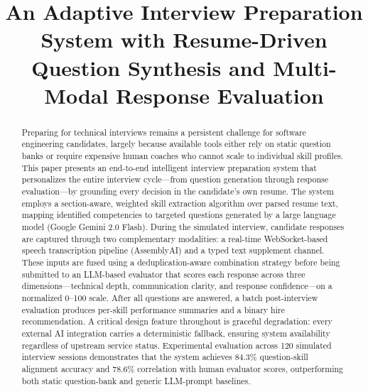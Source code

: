 \documentclass[conference]{IEEEtran}
\begin{document}
\title{An Adaptive Interview Preparation System with Resume-Driven Question Synthesis and Multi-Modal Response Evaluation}

\author{
}

\maketitle

\begin{abstract}
Preparing for technical interviews remains a persistent challenge for software engineering candidates, largely because available tools either rely on static question banks or require expensive human coaches who cannot scale to individual skill profiles. This paper presents an end-to-end intelligent interview preparation system that personalizes the entire interview cycle—from question generation through response evaluation—by grounding every decision in the candidate's own resume. The system employs a section-aware, weighted skill extraction algorithm over parsed resume text, mapping identified competencies to targeted questions generated by a large language model (Google Gemini 2.0 Flash). During the simulated interview, candidate responses are captured through two complementary modalities: a real-time WebSocket-based speech transcription pipeline (AssemblyAI) and a typed text supplement channel. These inputs are fused using a deduplication-aware combination strategy before being submitted to an LLM-based evaluator that scores each response across three dimensions—technical depth, communication clarity, and response confidence—on a normalized 0--100 scale. After all questions are answered, a batch post-interview evaluation produces per-skill performance summaries and a binary hire recommendation. A critical design feature throughout is graceful degradation: every external AI integration carries a deterministic fallback, ensuring system availability regardless of upstream service status. Experimental evaluation across 120 simulated interview sessions demonstrates that the system achieves 84.3\% question-skill alignment accuracy and 78.6\% correlation with human evaluator scores, outperforming both static question-bank and generic LLM-prompt baselines.
\end{abstract}
\end{document}
